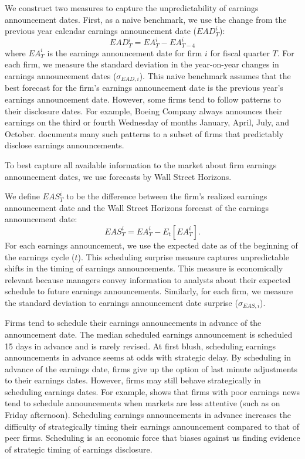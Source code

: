 \documentclass[ecta,nameyear,draft]{econsocart}
\theoremstyle{theorem}
\numberwithin{lemma}{section}
\numberwithin{proposition}{section}
\numberwithin{equation}{section}
\numberwithin{figure}{section}
\begin{document}
We construct two measures to capture the unpredictability of earnings announcement dates. First, as a naive benchmark, we use the change from the previous year calendar earnings announcement date ($EAD^{i}_{T}$): 
\begin{equation}
    EAD^{i}_{T} =EA^{i}_{T} - EA^{i}_{T-4}
\end{equation}
where $EA^{i}_{T}$ is the earnings announcement date for firm $i$ for fiscal quarter $T$. For each firm, we measure the standard deviation in the year-on-year changes in earnings announcement dates ($\sigma_{EAD,i}$). This naive benchmark assumes that the best forecast for the firm's earnings announcement date is the previous year's earnings announcement date. However, some firms tend to follow patterns to their disclosure dates. For example, Boeing Company always announces their earnings on the third or fourth Wednesday of months January, April, July, and October. \cite{noh2021calendar} documents many such patterns to a subset of firms that predictably disclose earnings announcements. 

To best capture all available information to the market about firm earnings announcement dates, we use forecasts by Wall Street Horizons. %

We define $EAS^{i}_{T}$ to be the difference between the firm's realized earnings announcement date and the Wall Street Horizons forecast of the earnings announcement date: 
\begin{equation}
    EAS^{i}_{T} =EA^{i}_{T} - E_{t}[EA^{i}_{T}].
\end{equation}
For each earnings announcement, we use the expected date as of the beginning of the earnings cycle ($t$). This scheduling surprise measure captures unpredictable shifts in the timing of earnings announcements. This measure is economically relevant because managers convey information to analysts about their expected schedule to future earnings announcements. Similarly, for each firm, we measure the standard deviation to earnings announcement date surprise ($\sigma_{EAS,i}$).

Firms tend to schedule their earnings announcements in advance of the announcement date. The median scheduled earnings announcement is scheduled 15 days in advance and is rarely revised. At first blush, scheduling earnings announcements in advance seems at odds with strategic delay. By scheduling in advance of the earnings date, firms give up the option of last minute adjustments to their earnings dates. However, firms may still behave strategically in scheduling earnings dates. For example, \cite{dehaan2015market} shows that firms with poor earnings news tend to schedule announcements when markets are less attentive (such as on Friday afternoon). Scheduling earnings announcements in advance increases the difficulty of strategically timing their earnings announcement compared to that of peer firms. Scheduling is an economic force that biases against us finding evidence of strategic timing of earnings disclosure. 
\end{document}
